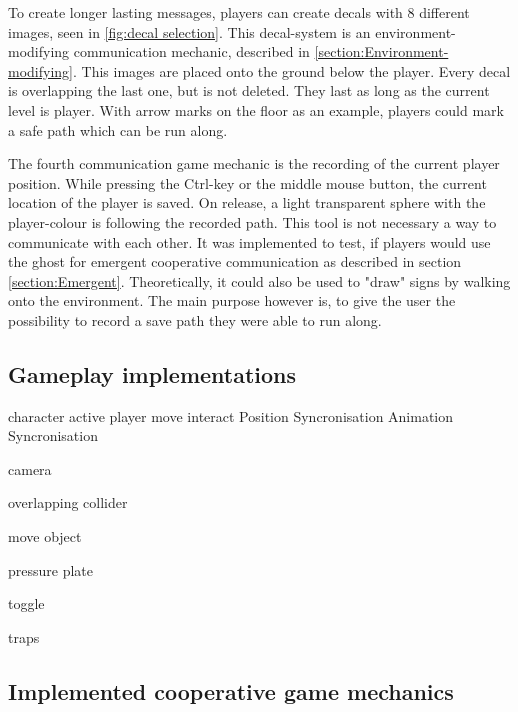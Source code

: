 To create longer lasting messages, players can create decals with 8 different images, seen in \ref{fig:decal selection}. This decal-system is an environment-modifying communication mechanic, described in \ref{section:Environment-modifying}. This images are placed onto the ground below the player. Every decal is overlapping the last one, but is not deleted. They last as long as the current level is player. With arrow marks on the floor as an example, players could mark a safe path which can be run along.


The fourth communication game mechanic is the recording of the current player position. While pressing the Ctrl-key or the middle mouse button, the current location of the player is saved. On release, a light transparent sphere with the player-colour is following the recorded path. This tool is not necessary a way to communicate with each other. It was implemented to test, if players would use the ghost for emergent cooperative communication as described in section \ref{section:Emergent}. Theoretically, it could also be used to "draw" signs by walking onto the environment. The main purpose however is, to give the user the possibility to record a save path they were able to run along.



\subsection{Gameplay implementations}
\label{section:Gameplay implementations}

character
    active player
    move
    interact
    Position Syncronisation
    Animation Syncronisation
    
camera

overlapping collider

move object

pressure plate

toggle

traps








\subsection{Implemented cooperative game mechanics}
\label{section:Implemented cooperative game mechanics}

